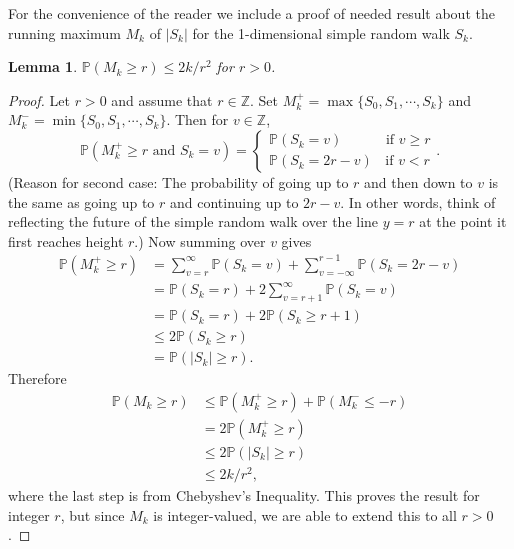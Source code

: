\documentclass[preprint,12pt]{elsarticle}
\newtheorem{lemma}[theorem]{Lemma}
\theoremstyle{definition}
\theoremstyle{remark}
\numberwithin{equation}{section}
\begin{document}
For the convenience of the reader we include a proof of needed result about the running maximum $M_k$ of $|S_k|$ for the 1-dimensional simple random walk $S_k$.

\begin{lemma}\label{runningmax}
$\mathbb{P}(M_k \geq r) \leq 2k/r^2$ for $r >0$.
\end{lemma}

\begin{proof}
Let $r>0$ and assume that $r\in \mathbb{Z}$.
Set $M_k^+ = \max\{ S_0, S_1, \cdots, S_k\}$ and $M_k^- = \min \{ S_0, S_1, \cdots, S_k\}$.  
Then for $v \in \mathbb{Z}$,
$$ \mathbb{P}(M_k^+ \geq r \text{ and } S_k = v) = 
\begin{cases} \mathbb{P}(S_k = v) \;\;\;\;\;\;\;\;\;\; \text{ if } v\geq r\\
\mathbb{P}(S_k = 2r-v) \;\; \text{ if } v < r
\end{cases}.
$$
(Reason for second case:   The probability of going up to $r$ and then down to $v$ is the same as going up to $r$ and continuing up to $2r-v$.  In other words, think of reflecting the future of the simple random walk over the line $y=r$ at the point it first reaches height $r$.)
Now summing over $v$ gives
\begin{align*}
 \mathbb{P}(M_k^+ \geq r) &= \sum_{v=r}^\infty \mathbb{P} (S_k = v) +  \sum_{v=-\infty}^{r-1} \mathbb{P} (S_k = 2r-v) \\
   &= \mathbb{P}( S_k = r)+2 \sum_{v=r+1}^\infty \mathbb{P} (S_k = v) \\
   &= \mathbb{P}( S_k = r)+2\mathbb{P}( S_k \geq r+1) \\
   &\leq 2\mathbb{P}( S_k \geq r)\\
   &=\mathbb{P}( |S_k| \geq r).
\end{align*}
Therefore
\begin{align*}
 \mathbb{P}(M_k \geq r) &\leq  \mathbb{P}(M_k^+ \geq r) +  \mathbb{P}(M_k^- \leq -r) \\
 &= 2 \mathbb{P}(M_k^+ \geq r) \\
 &\leq 2\mathbb{P}( |S_k| \geq r) \\ 
 &\leq 2k/r^2,
\end{align*}
where the last step is from Chebyshev's Inequality.
This proves the result for integer $r$, but since $M_k$ is integer-valued, we are able to extend this to all $r>0$.
\end{proof}







\def\cprime{$'$}
\end{document}
